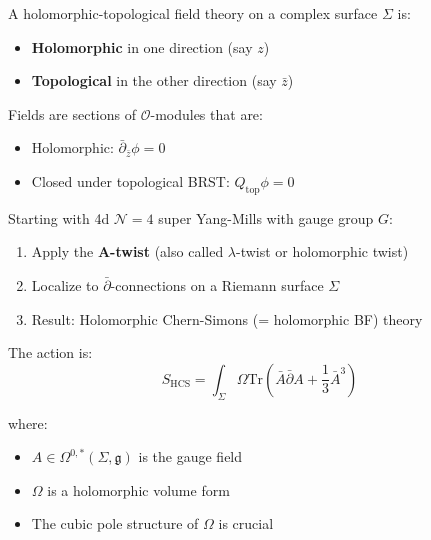\begin{definition}
A holomorphic-topological field theory on a complex surface $\Sigma$ is:
\begin{itemize}
\item \textbf{Holomorphic} in one direction (say $z$)
\item \textbf{Topological} in the other direction (say $\bar{z}$)
\end{itemize}

Fields are sections of $\mathcal{O}$-modules that are:
\begin{itemize}
\item Holomorphic: $\bar{\partial}_{\bar{z}} \phi = 0$
\item Closed under topological BRST: $Q_{\text{top}} \phi = 0$
\end{itemize}
\end{definition}

\begin{theorem}[HT Theory from 4d $\mathcal{N}=4$ SYM]
Starting with 4d $\mathcal{N}=4$ super Yang-Mills with gauge group $G$:
\begin{enumerate}
\item Apply the \textbf{A-twist} (also called $\lambda$-twist or holomorphic twist)
\item Localize to $\bar{\partial}$-connections on a Riemann surface $\Sigma$
\item Result: Holomorphic Chern-Simons (= holomorphic BF) theory
\end{enumerate}

The action is:
$$S_{\text{HCS}} = \int_{\Sigma} \Omega \text{Tr}\left(\bar{A} \bar{\partial} A + 
\frac{1}{3} \bar{A}^3\right)$$

where:
\begin{itemize}
\item $A \in \Omega^{0,*}(\Sigma, \mathfrak{g})$ is the gauge field
\item $\Omega$ is a holomorphic volume form
\item The cubic pole structure of $\Omega$ is crucial
\end{itemize}
\end{theorem}

